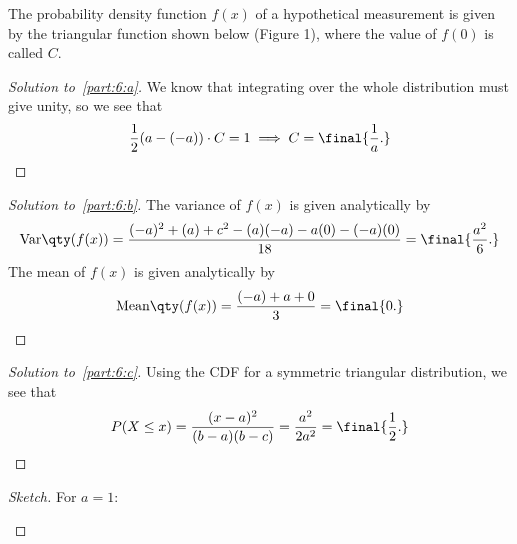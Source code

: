 \documentclass[10pt, physics, diagram]{homework}
\begin{document}
	\begin{problem}[12pts]
		The probability density function $f(x)$ of a hypothetical measurement is given by the triangular function shown below (Figure 1), where the value of $f(0)$ is called $C$. 
	\end{problem}
	\begin{proof}[Solution to~\ref{part:6:a}]
		We know that integrating over the whole distribution must give unity, so we see that 
		\[ \frac{1}{2}(a - (-a))\cdot C = 1 \implies C = \final{\frac{1}{a}.}\qedhere \]
	\end{proof}
	\begin{proof}[Solution to~\ref{part:6:b}]
		The variance of $f(x)$ is given analytically by
		\[ \text{Var}\qty(f(x)) = \frac{(-a)^2 + (a) + c^2 - (a)(-a) - a(0) - (-a)(0)}{18} = \final{\frac{a^2}{6}.} \]
		The mean of $f(x)$ is given analytically by 
		\[ \text{Mean}\qty(f(x)) = \frac{(-a) + a + 0}{3} = \final{0.}\qedhere \]
	\end{proof}
	\begin{proof}[Solution to~\ref{part:6:c}]
		Using the CDF for a symmetric triangular distribution, we see that 
		\[ P(X \leq x) = \frac{(x-a)^2}{(b-a)(b-c)} = \frac{a^2}{2a^2} = \final{\frac{1}{2}.}\qedhere \]
	\end{proof}
	\begin{proof}[Sketch]
		For $a = 1$:
		\begin{center}
		\end{center}
	\end{proof}
\end{document}
